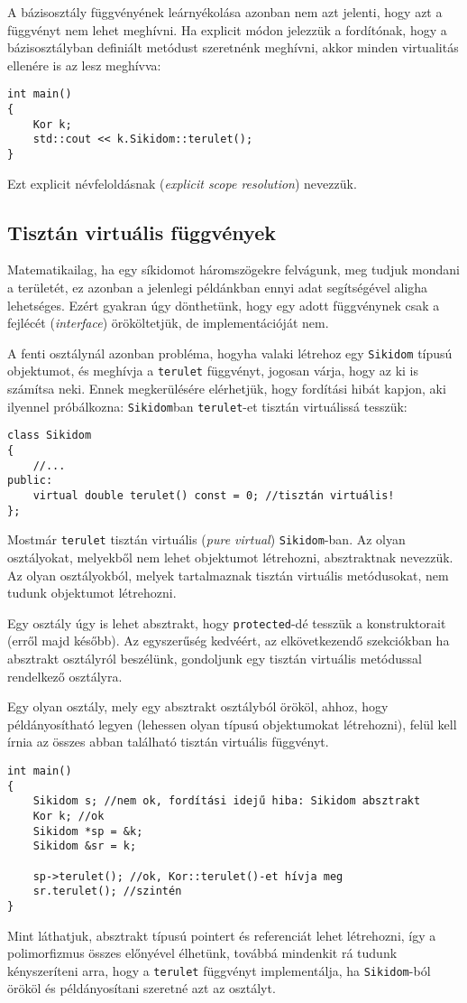 \documentclass[a4paper,11.5pt,table]{article}
\begin{document}
	A bázisosztály függvényének leárnyékolása azonban nem azt jelenti, hogy azt a függvényt nem lehet meghívni. Ha explicit módon jelezzük a fordítónak, hogy a bázisosztályban definiált metódust szeretnénk meghívni, akkor minden virtualitás ellenére is az lesz meghívva:
	\begin{lstlisting}
int main()
{
	Kor k;
	std::cout << k.Sikidom::terulet();
}
	\end{lstlisting}
	Ezt explicit névfeloldásnak (\textit{explicit scope resolution}) nevezzük.
	\subsection{Tisztán virtuális függvények}
	Matematikailag, ha egy síkidomot háromszögekre felvágunk, meg tudjuk mondani a területét, ez azonban a jelenlegi példánkban ennyi adat segítségével aligha lehetséges. Ezért gyakran úgy dönthetünk, hogy egy adott függvénynek csak a fejlécét (\textit{interface}) örököltetjük, de implementációját nem.
	
	A fenti osztálynál azonban probléma, hogyha valaki létrehoz egy \texttt{Sikidom} típusú objektumot, és meghívja a \texttt{terulet} függvényt, jogosan várja, hogy az ki is számítsa neki. Ennek megkerülésére elérhetjük, hogy fordítási hibát kapjon, aki ilyennel próbálkozna: \texttt{Sikidom}ban \texttt{terulet}-et tisztán virtuálissá tesszük:
	
\begin{lstlisting}
class Sikidom
{
	//...
public:
	virtual double terulet() const = 0; //tisztán virtuális!
};
\end{lstlisting}
	Mostmár \texttt{terulet} tisztán virtuális (\textit{pure virtual}) \texttt{Sikidom}-ban. Az olyan osztályokat, melyekből nem lehet objektumot létrehozni, absztraktnak nevezzük. Az olyan osztályokból, melyek tartalmaznak tisztán virtuális metódusokat, nem tudunk objektumot létrehozni.
	\begin{note}
		Egy osztály úgy is lehet absztrakt, hogy \texttt{protected}-dé tesszük a konstruktorait (erről majd később). Az egyszerűség kedvéért, az elkövetkezendő szekciókban ha absztrakt osztályról beszélünk, gondoljunk egy tisztán virtuális metódussal rendelkező osztályra.
	\end{note}
	Egy olyan osztály, mely egy absztrakt osztályból örököl, ahhoz, hogy példányosítható legyen (lehessen olyan típusú objektumokat létrehozni), felül kell írnia az összes abban található tisztán virtuális függvényt.
	\begin{lstlisting}
int main()
{
	Sikidom s; //nem ok, fordítási idejű hiba: Sikidom absztrakt
	Kor k; //ok
	Sikidom *sp = &k;
	Sikidom &sr = k;
	
	sp->terulet(); //ok, Kor::terulet()-et hívja meg
	sr.terulet(); //szintén
}
	\end{lstlisting}
	Mint láthatjuk, absztrakt típusú pointert és referenciát lehet létrehozni, így a polimorfizmus összes előnyével élhetünk, továbbá mindenkit rá tudunk kényszeríteni arra, hogy a \texttt{terulet} függvényt implementálja, ha \texttt{Sikidom}-ból örököl és példányosítani szeretné azt az osztályt.
	
\end{document}
